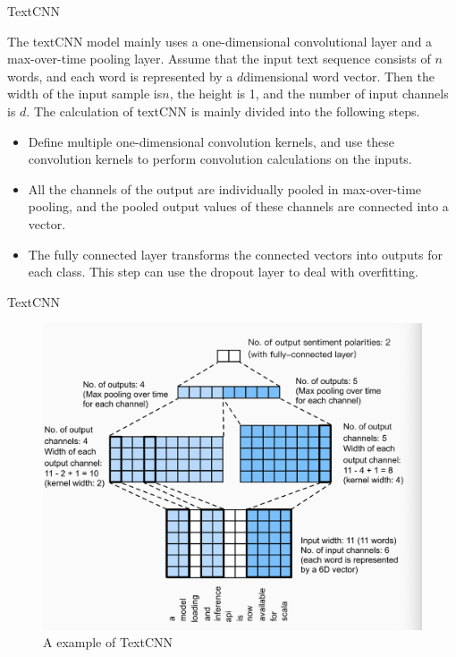 \documentclass[
 size=14pt,
 paper=smartboard,  %
 mode=present, 		%
 display=slides, 	%
 style=tuliplab,  	%
 pauseslide,
 fleqn,leqno]{powerdot}
\begin{document}

\begin{slide}{TextCNN}
	
	The textCNN model mainly uses 
	a one-dimensional convolutional layer and 
	a max-over-time pooling layer. 
	Assume that 
	the input text sequence consists of $ n $ words, 
	and each word is represented by 
	a $ d  $dimensional word vector. 
	Then the width of the input sample is$  n $, 
	the height is 1, 
	and the number of input channels is $ d $. 
	The calculation of textCNN is mainly divided into the following steps.
	
	\begin{itemize}
		\item 
		Define multiple one-dimensional convolution kernels, 
		and use these convolution kernels to 
		perform convolution calculations on the inputs. 
		\item 
		All the channels of the output are individually pooled 
		in max-over-time pooling, 
		and the pooled output values of 
		these channels are connected into a vector.
		\item 
		The fully connected layer transforms 
		the connected vectors into outputs for each class. 
		This step can use the dropout layer to deal with overfitting.
	\end{itemize}
	
\end{slide}

\begin{slide}[toc=,bm=]{TextCNN}
	
	\begin{figure}
		\includegraphics[width=.7\linewidth]{figures/textCNN_en.eps}
		\caption{A example of TextCNN}
	\end{figure}
	
	
\end{slide}
\end{document}
